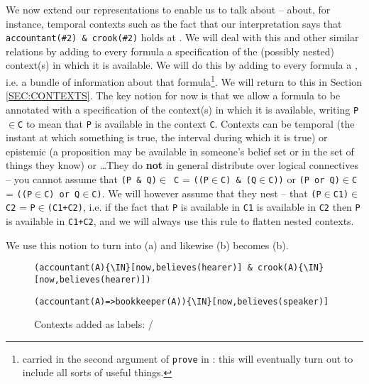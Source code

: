 \documentclass[11pt,a4paper]{article}
\newcommand{\IN}{$\in$}
\begin{document}
We now extend our representations to enable us to talk about  -- about, for
instance, temporal contexts such as
the fact that our interpretation 
says that \texttt{accountant(\#2) \& crook(\#2)} holds at
. We will deal with this and other similar
relations by adding to every formula a specification of the (possibly
nested) context(s) in which it is available. We will do this by adding to
every formula a  \citep{Gabbay:89,Gabbay:96}, i.e. a
bundle of information about that formula\footnote{carried in the second
argument of \texttt{prove} in : this will eventually turn
out to include all sorts of useful things.}. We will return to this in
Section \ref{SEC:CONTEXTS}. The key notion for now is that we allow a
formula to be annotated with a specification of the context(s) in which
it is available, writing \texttt{P{\IN}C} to mean that \texttt{P} is
available in the context \texttt{C}. Contexts can be temporal (the instant at which something
is true, the interval during which it is true) or epistemic (a
proposition may be available in someone's belief set or in the set of
things they know) or \ldots They do \textbf{not} in general distribute
over logical connectives -- you cannot assume that \texttt{(P \& Q)\IN
  C} = \texttt{((P{\IN}C) \& (Q{\IN}C))} or \texttt{(P or Q){\IN}C} =
\texttt{((P{\IN}C) or Q{\IN}C)}. We will however assume that they nest
-- that \texttt{(P{\IN}C1){\IN}C2} = \texttt{P\IN(C1+C2)}, i.e. if the fact
that \texttt{P} is available in \texttt{C1} is available in
\texttt{C2} then \texttt{P} is available in \texttt{C1+C2}, and we
will always use this rule to flatten nested contexts.

We use this notion to turn 
into (a) and likewise (b) becomes  (b).

\begin{figure}[ht]
\begin{center}
\begin{minipage}[t]{0.9\linewidth}
\begin{Verbatim}[commandchars=\\\{\}]
(accountant(A){\IN}[now,believes(hearer)] & crook(A){\IN}[now,believes(hearer)])
\end{Verbatim}

\end{minipage}

\vspace{0.2in}
\begin{minipage}[t]{0.45\linewidth}
\begin{Verbatim}[commandchars=\\\{\}]
(accountant(A)=>bookkeeper(A)){\IN}[now,believes(speaker)]
\end{Verbatim}

\end{minipage}
\end{center}
\caption{Contexts added as labels: /}\label{LABELS}
\end{figure}
\end{document}
